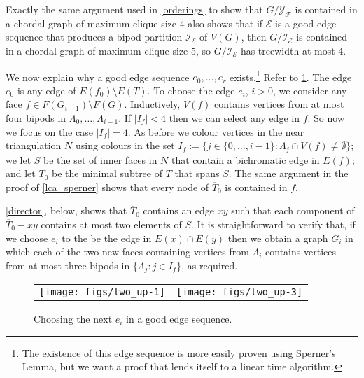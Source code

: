 \documentclass{patmorin}
\begin{document}
Exactly the same argument used in \cref{orderings} to show that $G/\mathcal{Y_F}$ is contained in a chordal graph of maximum clique size $4$ also shows that if $\mathcal{E}$ is a good edge sequence that produces a bipod partition $\mathcal{I_E}$ of $V(G)$, then $G/\mathcal{I_E}$ is contained in a chordal graph of maximum clique size $5$, so $G/\mathcal{I_E}$ has treewidth at most $4$.

We now explain why a good edge sequence $e_0,\ldots,e_r$ exists.\footnote{The existence of this edge sequence is more easily proven using Sperner's Lemma, but we want a proof that lends itself to a linear time algorithm.}  Refer to \cref{e_i}. The edge $e_0$ is any edge of $E(f_0)\setminus E(T)$.   To choose the edge $e_i$, $i>0$, we consider any face $f\in F(G_{i-1})\setminus F(G)$. Inductively, $V(f)$ contains vertices from at most four bipods in $\Lambda_0,\ldots,\Lambda_{i-1}$. If $|I_f| < 4$ then we can select any edge in $f$. So now we focus on the case $|I_f| = 4$. As before we colour vertices in the near triangulation $N$ using colours in the set $I_f:=\{j\in\{0,\ldots,i-1\}:\Lambda_j\cap V(f)\neq\emptyset\}$; we let $S$ be the set of inner faces in $N$ that contain a bichromatic edge in $E(f)$; and let $\overline{T}_0$ be the minimal subtree of $\overline{T}$ that spans $S$.  The same argument in the proof of \cref{lca_sperner} shows that every node of $\overline{T}_0$ is contained in $f$.

\cref{director}, below, shows that $\overline{T}_0$ contains an edge $xy$ such that each component of $\overline{T}_0-xy$ contains at most two elements of $S$.  It is straightforward to verify that, if we choose $e_i$ to the be the edge in $E(x)\cap E(y)$ then we obtain a graph $G_i$ in which each of the two new faces containing vertices from $\Lambda_i$ contains vertices from at most three bipods in $\{\Lambda_j:j\in I_f\}$, as required.

\begin{figure}[htbp]
  \begin{center}
    \begin{tabular}{cc}
       \texttt{[image: figs/two\_up-1]} &
       \texttt{[image: figs/two\_up-3]}
     \end{tabular}
  \end{center}
  \caption{Choosing the next $e_i$ in a  good edge sequence.}
  \label{e_i}
\end{figure}
\end{document}
